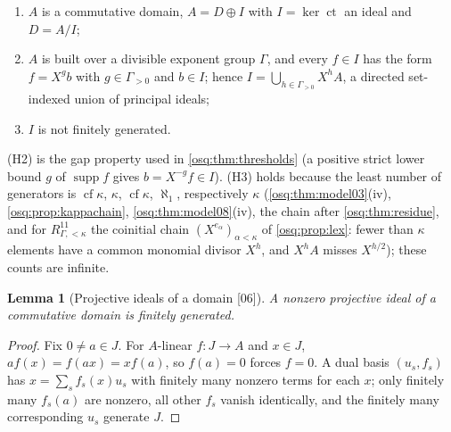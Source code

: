 \documentclass[11pt,letterpaper]{article}
\numberwithin{equation}{section}
\newtheorem{lemma}[lemma]{Lemma}
\theoremstyle{definition}
\theoremstyle{remark}
\theoremstyle{plain}
\newcommand{\ct}{\operatorname{ct}}
\newcommand{\supp}{\operatorname{supp}}
\newcommand{\cf}{\operatorname{cf}}
\newcommand{\src}[1]{\textup{\textsf{[#1]}}}
\begin{document}
\begin{enumerate}
\item[(H1)] $A$ is a commutative domain, $A=D\oplus I$ with $I=\ker\ct$ an ideal and $D=A/I$;
\item[(H2)] $A$ is built over a divisible exponent group $\Gamma$, and every $f\in I$ has the form
$f=X^gb$ with $g\in\Gamma_{>0}$ and $b\in I$; hence $I=\bigcup_{h\in\Gamma_{>0}}X^hA$, a directed
set-indexed union of principal ideals;
\item[(H3)] $I$ is not finitely generated.
\end{enumerate}
(H2) is the gap property used in \cref{osq:thm:thresholds} (a positive strict lower bound $g$ of
$\supp f$ gives $b=X^{-g}f\in I$). (H3) holds because the least number of generators is $\cf\kappa$,
$\kappa$, $\cf\kappa$, $\aleph_1$, respectively $\kappa$ (\cref{osq:thm:model03}(iv),
\cref{osq:prop:kappachain}, \cref{osq:thm:model08}(iv), the chain after \cref{osq:thm:residue}, and for
$R^{11}_{\Gamma,<\kappa}$ the coinitial chain $(X^{e_\alpha})_{\alpha<\kappa}$ of \cref{osq:prop:lex}:
fewer than $\kappa$ elements have a common monomial divisor $X^h$, and $X^hA$ misses $X^{h/2}$); these
counts are infinite.

\begin{lemma}[Projective ideals of a domain \src{06}]\label{osq:lem:projideal}
A nonzero projective ideal of a commutative domain is finitely generated.
\end{lemma}
\begin{proof}
Fix $0\ne a\in J$. For $A$-linear $f:J\to A$ and $x\in J$, $af(x)=f(ax)=xf(a)$, so $f(a)=0$ forces
$f=0$. A dual basis $(u_s,f_s)$ has $x=\sum_sf_s(x)u_s$ with finitely many nonzero terms for each $x$;
only finitely many $f_s(a)$ are nonzero, all other $f_s$ vanish identically, and the finitely many
corresponding $u_s$ generate $J$.
\end{proof}
\end{document}
